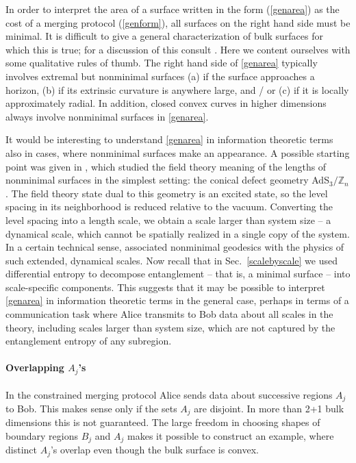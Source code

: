\documentclass[12pt]{article}
\begin{document}
In order to interpret the area of a surface written in the form (\ref{genarea}) as the cost of a merging protocol (\ref{genform}), all surfaces on the right hand side must be minimal. It is difficult to give a general characterization of bulk surfaces for which this is true; for a discussion of this consult \cite{xi}. Here we content ourselves with some qualitative rules of thumb. The right hand side of \eqref{genarea} typically involves extremal but nonminimal surfaces (a) if the surface approaches a horizon, (b) if its extrinsic curvature is anywhere large, and / or (c) if it is locally  approximately radial. In addition, closed convex curves in higher dimensions always involve nonminimal surfaces in \eqref{genarea}.

It would be interesting to understand \eqref{genarea} in information theoretic terms also in cases, where nonminimal surfaces make an appearance. A possible starting point was given in \cite{entwinement}, which studied the field theory meaning of the lengths of nonminimal surfaces in the simplest setting: the conical defect geometry AdS$_3 / \mathbb{Z}_n$. The field theory state dual to this geometry is an excited state, so the level spacing in its neighborhood is reduced relative to the vacuum. Converting the level spacing into a length scale, we obtain a scale larger than system size -- a dynamical scale, which cannot be spatially realized in a single copy of the system. In a certain technical sense, \cite{entwinement} associated nonminimal geodesics with the physics of such extended, dynamical scales. Now recall that in Sec.~\ref{scalebyscale} we used differential entropy to decompose entanglement -- that is, a minimal surface -- into scale-specific components. This suggests that it may be possible to interpret \eqref{genarea} in information theoretic terms in the general case, perhaps in terms of a communication task where Alice transmits to Bob data about all scales in the theory, including scales larger than system size, which are not captured by the entanglement entropy of any subregion.

\paragraph{Overlapping $A_j$'s}
In the constrained merging protocol Alice sends data about successive regions $A_j$ to Bob. This makes sense only if the sets $A_j$ are disjoint. In more than 2+1 bulk dimensions this is not guaranteed. The large freedom in choosing shapes of boundary regions $B_j$ and $A_j$ makes it possible to construct an example, where distinct $A_j$'s overlap even though the bulk surface is convex.
\end{document}
